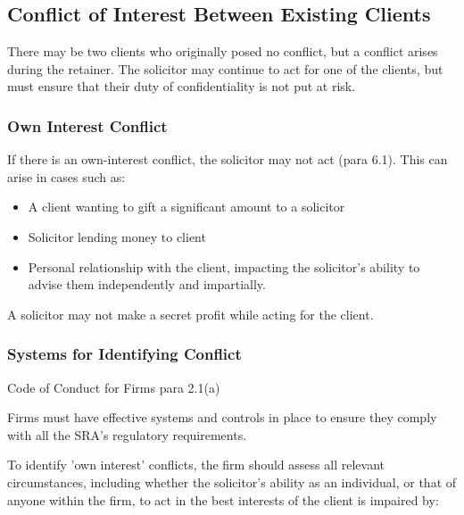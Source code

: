 \documentclass[
]{article}
\providecommand{\tightlist}{%
  \setlength{\itemsep}{0pt}\setlength{\parskip}{0pt}}
\newenvironment{env-28b706cc-8a08-422f-af86-ede86c79505b}
{
    \savenotes\tcolorbox[blanker,breakable,left=5pt,borderline west={2pt}{-4pt}{green}]
}
{
    \endtcolorbox\spewnotes
}
\begin{document}
\hypertarget{conflict-of-interest-between-existing-clients}{%
\subsection{Conflict of Interest Between Existing
Clients}\label{conflict-of-interest-between-existing-clients}}

There may be two clients who originally posed no conflict, but a
conflict arises during the retainer. The solicitor may continue to act
for one of the clients, but must ensure that their duty of
confidentiality is not put at risk.

\hypertarget{own-interest-conflict}{%
\subsubsection{Own Interest Conflict}\label{own-interest-conflict}}

If there is an own-interest conflict, the solicitor may not act (para
6.1). This can arise in cases such as:

\begin{itemize}
\tightlist
\item
  A client wanting to gift a significant amount to a solicitor
\item
  Solicitor lending money to client
\item
  Personal relationship with the client, impacting the solicitor's
  ability to advise them independently and impartially.
\end{itemize}

A solicitor may not make a secret profit while acting for the client.

\hypertarget{systems-for-identifying-conflict}{%
\subsubsection{Systems for Identifying
Conflict}\label{systems-for-identifying-conflict}}

\begin{env-28b706cc-8a08-422f-af86-ede86c79505b}

Code of Conduct for Firms para 2.1(a)

Firms must have effective systems and controls in place to ensure they
comply with all the SRA's regulatory requirements.

\end{env-28b706cc-8a08-422f-af86-ede86c79505b}

To identify 'own interest' conflicts, the firm should assess all
relevant circumstances, including whether the solicitor's ability as an
individual, or that of anyone within the firm, to act in the best
interests of the client is impaired by:
\end{document}

